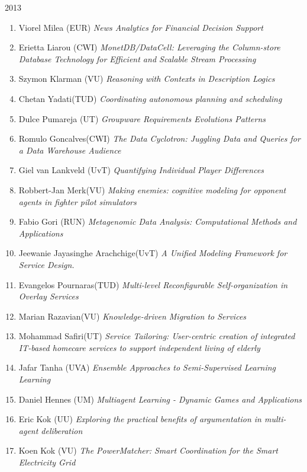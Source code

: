 \begin{multicols}{2}
\begin{scriptsize}
\vspace{0.2cm}
2013
\vspace{0.2cm}
\begin{enumerate}[leftmargin=*,noitemsep,topsep=0pt,parsep=1pt,partopsep=0pt]
\renewcommand{\labelenumi}{2013-\arabic{enumi}}
\item Viorel Milea (EUR) \textit{News Analytics for Financial Decision Support
}\item Erietta Liarou (CWI) \textit{MonetDB/DataCell: Leveraging the Column-store Database Technology for Efficient and Scalable Stream Processing
}\item Szymon Klarman (VU) \textit{Reasoning with Contexts in Description Logics
}\item Chetan Yadati(TUD) \textit{Coordinating autonomous planning and scheduling 
}\item Dulce Pumareja (UT) \textit{Groupware Requirements Evolutions Patterns 
}\item Romulo Goncalves(CWI) \textit{The Data Cyclotron: Juggling Data and Queries for a Data Warehouse Audience
}\item Giel van Lankveld (UvT) \textit{Quantifying Individual Player Differences 
}\item Robbert-Jan Merk(VU) \textit{Making enemies: cognitive modeling for opponent agents in fighter pilot simulators
}\item Fabio Gori (RUN) \textit{Metagenomic Data Analysis: Computational Methods and Applications
}\item Jeewanie Jayasinghe Arachchige(UvT) \textit{A Unified Modeling Framework for Service Design.
}\item Evangelos Pournaras(TUD) \textit{Multi-level Reconfigurable Self-organization in Overlay Services
}\item Marian Razavian(VU) \textit{Knowledge-driven Migration to Services
}\item Mohammad Safiri(UT) \textit{Service Tailoring: User-centric creation of integrated IT-based homecare services to support independent living of elderly
}\item Jafar Tanha (UVA) \textit{Ensemble Approaches to Semi-Supervised Learning Learning
}\item Daniel Hennes (UM) \textit{Multiagent Learning - Dynamic Games and Applications
}\item Eric Kok (UU) \textit{Exploring the practical benefits of argumentation in multi-agent deliberation
}\item Koen Kok (VU) \textit{The PowerMatcher: Smart Coordination for the Smart Electricity Grid
}
\end{enumerate}
\end{scriptsize}
\end{multicols}
